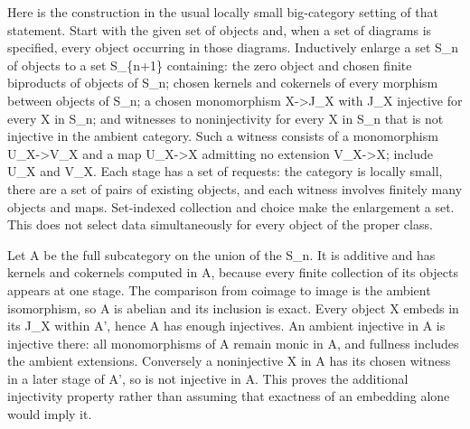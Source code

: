 \documentclass[11pt]{article}
\begin{document}
Here is the construction in the usual locally small big-category setting of that statement. Start with the given set of objects and,\allowbreak{} when a set of diagrams is specified,\allowbreak{} every object occurring in those diagrams. Inductively enlarge a set S\_\allowbreak{}n of objects to a set S\_\allowbreak{}\{n\allowbreak{}+1\} containing:\allowbreak{} the zero object and chosen finite biproducts of objects of S\_\allowbreak{}n; chosen kernels and cokernels of every morphism between objects of S\_\allowbreak{}n; a chosen monomorphism X\allowbreak{}->J\_\allowbreak{}X with J\_\allowbreak{}X injective for every X in S\_\allowbreak{}n; and witnesses to noninjectivity for every X in S\_\allowbreak{}n that is not injective in the ambient category. Such a witness consists of a monomorphism U\_\allowbreak{}X\allowbreak{}->V\_\allowbreak{}X and a map U\_\allowbreak{}X\allowbreak{}->X admitting no extension V\_\allowbreak{}X\allowbreak{}->X; include U\_\allowbreak{}X and V\_\allowbreak{}X. Each stage has a set of requests:\allowbreak{} the category is locally small,\allowbreak{} there are a set of pairs of existing objects,\allowbreak{} and each witness involves finitely many objects and maps. Set-indexed collection and choice make the enlargement a set. This does not select data simultaneously for every object of the proper class.

Let A\textquotesingle{} be the full subcategory on the union of the S\_\allowbreak{}n. It is additive and has kernels and cokernels computed in A,\allowbreak{} because every finite collection of its objects appears at one stage. The comparison from coimage to image is the ambient isomorphism,\allowbreak{} so A\textquotesingle{} is abelian and its inclusion is exact. Every object X embeds in its J\_\allowbreak{}X within A',\allowbreak{} hence A\textquotesingle{} has enough injectives. An ambient injective in A\textquotesingle{} is injective there:\allowbreak{} all monomorphisms of A\textquotesingle{} remain monic in A,\allowbreak{} and fullness includes the ambient extensions. Conversely a noninjective X in A\textquotesingle{} has its chosen witness in a later stage of A',\allowbreak{} so is not injective in A\textquotesingle. This proves the additional injectivity property rather than assuming that exactness of an embedding alone would imply it.
\end{document}
